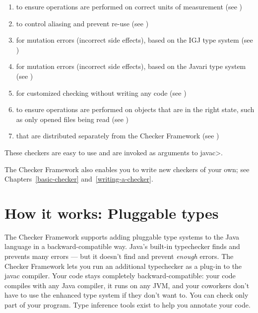 \begin{enumerate}
\item
   to ensure operations are
  performed on correct units of measurement
  (see )
\item
   to control aliasing and prevent
  re-use (see )
\item
   for mutation errors (incorrect
  side effects), based on the IGJ type system (see
  )
\item
   for mutation errors
  (incorrect side effects), based on the Javari type system (see
  )
\item
   for customized checking without
  writing any code (see )
\item
   to ensure operations are
  performed on objects that are in the right state, such as only opened
  files being read (see )
\item
   that are distributed
  separately from the Checker Framework
  (see )

\end{enumerate}

\noindent
These checkers are easy to use and are invoked as arguments to \<javac>.


The Checker Framework also enables you to write new checkers of your
own; see Chapters~\ref{basic-checker} and~\ref{writing-a-checker}.


\section{How it works:  Pluggable types\label{pluggable-types}}

The Checker Framework supports adding
pluggable type systems to the Java language in a backward-compatible way.
Java's built-in typechecker finds and prevents many errors --- but it
doesn't find and prevent \emph{enough} errors.  The Checker Framework lets you
run an additional typechecker as a plug-in to the javac compiler.  Your
code stays completely backward-compatible:  your code compiles with any
Java compiler, it runs on any JVM, and your coworkers don't have to use the
enhanced type system if they don't want to.  You can check only part of
your program.  Type inference tools exist to help you annotate your
code.


